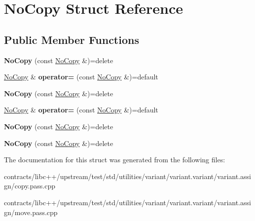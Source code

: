 \hypertarget{struct_no_copy}{}\section{No\+Copy Struct Reference}
\label{struct_no_copy}
\subsection*{Public Member Functions}
\begin{DoxyCompactItemize}
\item 
\mbox{\label{struct_no_copy_a7d96f64d55bdbf89e5560ddc247f6dc5}} 
{\bfseries No\+Copy} (const \mbox{\hyperlink{struct_no_copy}{No\+Copy}} \&)=delete
\item 
\mbox{\label{struct_no_copy_a235456672b9d547f6d16bc1ad0193d1c}} 
\mbox{\hyperlink{struct_no_copy}{No\+Copy}} \& {\bfseries operator=} (const \mbox{\hyperlink{struct_no_copy}{No\+Copy}} \&)=default
\item 
\mbox{\label{struct_no_copy_a7d96f64d55bdbf89e5560ddc247f6dc5}} 
{\bfseries No\+Copy} (const \mbox{\hyperlink{struct_no_copy}{No\+Copy}} \&)=delete
\item 
\mbox{\label{struct_no_copy_a235456672b9d547f6d16bc1ad0193d1c}} 
\mbox{\hyperlink{struct_no_copy}{No\+Copy}} \& {\bfseries operator=} (const \mbox{\hyperlink{struct_no_copy}{No\+Copy}} \&)=default
\item 
\mbox{\label{struct_no_copy_a7d96f64d55bdbf89e5560ddc247f6dc5}} 
{\bfseries No\+Copy} (const \mbox{\hyperlink{struct_no_copy}{No\+Copy}} \&)=delete
\item 
\mbox{\label{struct_no_copy_a7d96f64d55bdbf89e5560ddc247f6dc5}} 
{\bfseries No\+Copy} (const \mbox{\hyperlink{struct_no_copy}{No\+Copy}} \&)=delete
\end{DoxyCompactItemize}


The documentation for this struct was generated from the following files\+:\begin{DoxyCompactItemize}
\item 
contracts/libc++/upstream/test/std/utilities/variant/variant.\+variant/variant.\+assign/copy.\+pass.\+cpp\item 
contracts/libc++/upstream/test/std/utilities/variant/variant.\+variant/variant.\+assign/move.\+pass.\+cpp\end{DoxyCompactItemize}

